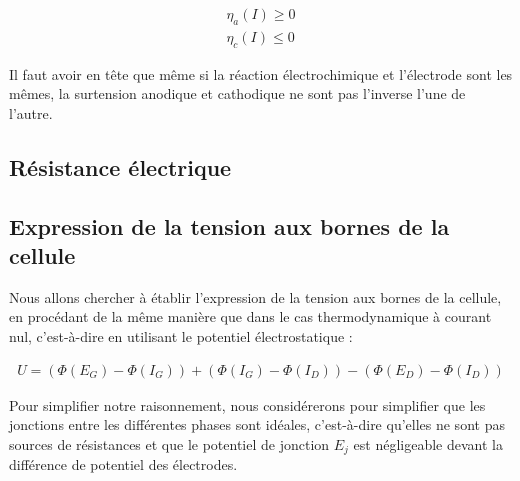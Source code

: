 \begin{align*}
\eta_a (I) \geq  0 \\
\eta_c (I) \leq 0
\end{align*}

Il faut avoir en tête que même si la réaction électrochimique et l'électrode sont les mêmes, la surtension anodique et cathodique ne sont pas l'inverse l'une de l'autre.

\subsection{Résistance électrique}


\subsection{Expression de la tension aux bornes de la cellule}

Nous allons chercher à établir l'expression de la tension aux bornes de la cellule, en procédant de la même manière que dans le cas thermodynamique à courant nul, c'est-à-dire en utilisant le potentiel électrostatique :

\begin{align*}
U = (\Phi ( E_G ) - \Phi ( I_G )) + (\Phi (I_G) - \Phi (I_D) ) - (\Phi ( E_D ) - \Phi ( I_D ))
\end{align*}

Pour simplifier notre raisonnement, nous considérerons pour simplifier que les jonctions entre les différentes phases sont idéales, c'est-à-dire qu'elles ne sont pas sources de résistances et que le potentiel de jonction $E_j$ est négligeable devant la différence de potentiel des électrodes.

